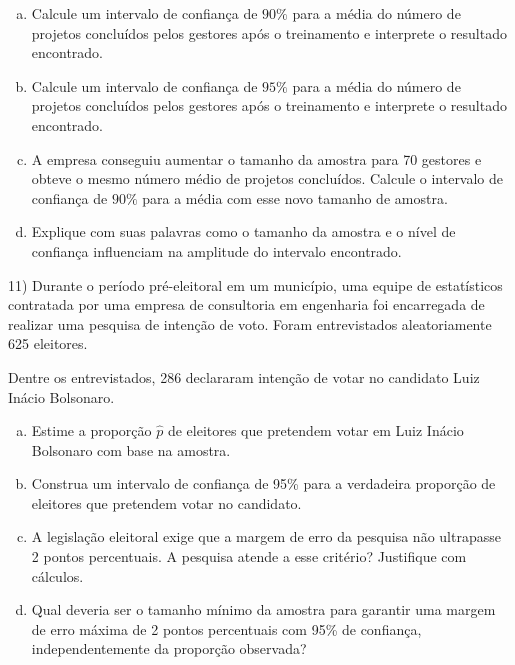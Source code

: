 \documentclass{article}
\begin{document}
\begin{enumerate}[a)]
    \item  Calcule um intervalo de confiança de \( 90\% \) para a média do número de projetos concluídos pelos gestores após o treinamento e interprete o resultado encontrado. 
    \item Calcule um intervalo de confiança de \( 95\% \) para a média do número de projetos concluídos pelos gestores após o treinamento e interprete o resultado encontrado.
    \item A empresa conseguiu aumentar o tamanho da amostra para 70 gestores e obteve o mesmo número médio de projetos concluídos. Calcule o  intervalo de confiança de \( 90\% \) para a média com esse novo tamanho de amostra. 
    \item Explique com suas palavras como o tamanho da amostra e o nível de confiança influenciam na amplitude do intervalo encontrado. 
\end{enumerate}

11) Durante o período pré-eleitoral em um município, uma equipe de estatísticos contratada por uma empresa de consultoria em engenharia
 foi encarregada de realizar uma pesquisa de intenção de voto. Foram entrevistados aleatoriamente 625 eleitores.

Dentre os entrevistados, 286 declararam intenção de votar no candidato Luiz Inácio Bolsonaro.

\begin{enumerate}[a)]
    \item Estime a proporção \( \hat{p} \) de eleitores que pretendem votar em Luiz Inácio Bolsonaro com base na amostra.

    \item Construa um intervalo de confiança de 95\% para a verdadeira proporção de eleitores que pretendem votar no candidato.

    \item A legislação eleitoral exige que a margem de erro da pesquisa não ultrapasse 2 pontos percentuais.
     A pesquisa atende a esse critério? Justifique com cálculos.

    \item Qual deveria ser o tamanho mínimo da amostra para garantir uma margem de erro máxima de 2 pontos percentuais com 95\% de confiança,
     independentemente da proporção observada?
\end{enumerate}
\end{document}
